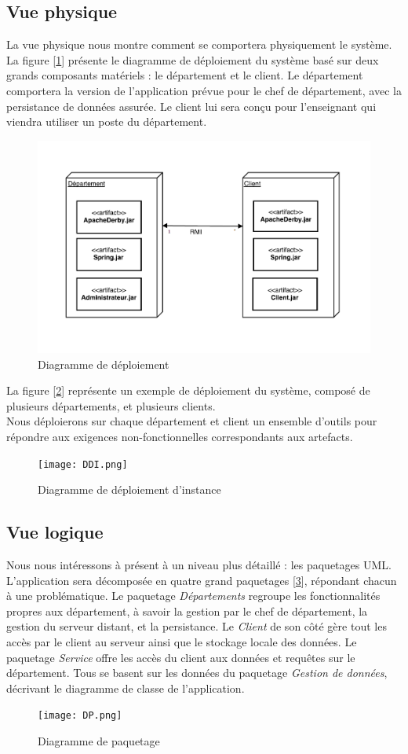 \documentclass[a4paper,11pt]{article}
\newcommand{\br}{\\\mbox{}}
\begin{document}
\subsection{Vue physique}
La vue physique nous montre comment se comportera physiquement le système. La figure [\ref{DD}] présente le diagramme de déploiement du système basé sur deux grands composants matériels : le département et le client. Le département comportera la version de l'application prévue pour le chef de département, avec la persistance de données assurée. Le client lui sera conçu pour l'enseignant qui viendra utiliser un poste du département.\br
\begin{figure}[h]
\centering
\includegraphics[scale=0.4]{Deploiment.png}
\caption{Diagramme de déploiement}
\label{DD}
\end{figure}
La figure [\ref{DDI}] représente un exemple de déploiement du système, composé de plusieurs départements, et plusieurs clients.\br
Nous déploierons sur chaque département et client un ensemble d'outils pour répondre aux exigences non-fonctionnelles correspondants aux artefacts.
\begin{figure}
\centering
\texttt{[image: DDI.png]}
\caption{Diagramme de déploiement d'instance}
\label{DDI}
\end{figure}

\subsection{Vue logique}
Nous nous intéressons à présent à un niveau plus détaillé : les paquetages UML. L'application sera décomposée en quatre grand paquetages [\ref{DP}], répondant chacun à une problématique. Le paquetage \textit{Départements} regroupe les fonctionnalités propres aux département, à savoir la gestion par le chef de département, la gestion du serveur distant, et la persistance. Le \textit{Client} de son côté gère tout les accès par le client au serveur ainsi que le stockage locale des données. Le paquetage \textit{Service} offre les accès du client aux données et requêtes sur le département. Tous se basent sur les données du paquetage \textit{Gestion de données}, décrivant le diagramme de classe de l'application.
\begin{figure}
\centering
\texttt{[image: DP.png]}
\caption{Diagramme de paquetage}
\label{DP}
\end{figure}
\end{document}
